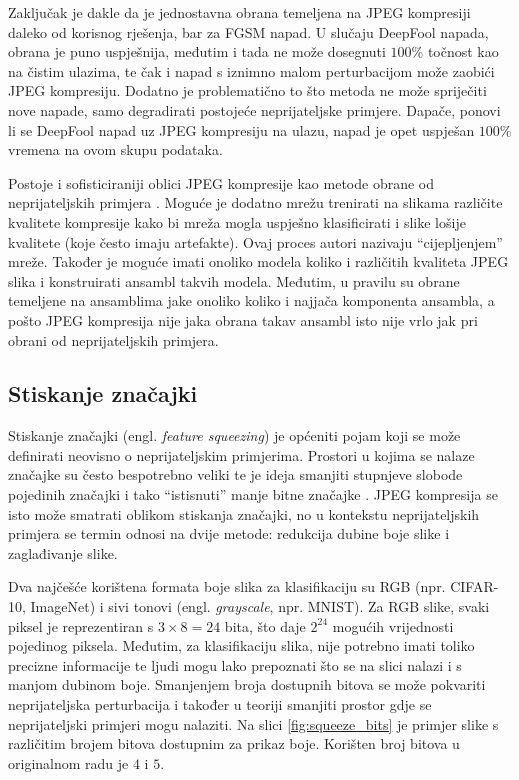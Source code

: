 \documentclass[utf8, diplomski]{fer}
\begin{document}
Zaključak je dakle da je jednostavna obrana temeljena na JPEG kompresiji daleko od korisnog rješenja, bar za FGSM napad. U slučaju DeepFool napada, obrana je puno uspješnija, međutim i tada ne može dosegnuti $100\%$ točnost kao na čistim ulazima, te čak i napad s iznimno malom perturbacijom može zaobići JPEG kompresiju. Dodatno je problematično to što metoda ne može spriječiti nove napade, samo degradirati postojeće neprijateljske primjere. Dapače, ponovi li se DeepFool napad uz JPEG kompresiju na ulazu, napad je opet uspješan $100\%$ vremena na ovom skupu podataka.
\par
Postoje i sofisticiraniji oblici JPEG kompresije kao metode obrane od neprijateljskih primjera \citep{jpeg2}. Moguće je dodatno mrežu trenirati na slikama različite kvalitete kompresije kako bi mreža mogla uspješno klasificirati i slike lošije kvalitete (koje često imaju artefakte). Ovaj proces autori nazivaju ``cijepljenjem'' mreže. Također je moguće imati onoliko modela koliko i različitih kvaliteta JPEG slika i konstruirati ansambl takvih modela. Međutim, u pravilu su obrane temeljene na ansamblima jake onoliko koliko i najjača komponenta ansambla, a pošto JPEG kompresija nije jaka obrana takav ansambl isto nije vrlo jak pri obrani od neprijateljskih primjera.

\subsection{Stiskanje značajki}
Stiskanje značajki (engl. \textit{feature squeezing}) je općeniti pojam koji se može definirati neovisno o neprijateljskim primjerima. Prostori u kojima se nalaze značajke su često bespotrebno veliki te je ideja smanjiti stupnjeve slobode pojedinih značajki i tako ``istisnuti'' manje bitne značajke \citep{squeezing}. JPEG kompresija se isto može smatrati oblikom stiskanja značajki, no u kontekstu neprijateljskih primjera se termin odnosi na dvije metode: redukcija dubine boje slike i zaglađivanje slike. \par
Dva najčešće korištena formata boje slika za klasifikaciju su RGB (npr. CIFAR-10, ImageNet) i sivi tonovi (engl. \textit{grayscale}, npr. MNIST). Za RGB slike, svaki piksel je reprezentiran s $3 \times 8 = 24$ bita, što daje $2^{24}$ mogućih vrijednosti pojedinog piksela. Međutim, za klasifikaciju slika, nije potrebno imati toliko precizne informacije te ljudi mogu lako prepoznati što se na slici nalazi i s manjom dubinom boje. Smanjenjem broja dostupnih bitova se može pokvariti neprijateljska perturbacija i također u teoriji smanjiti prostor gdje se neprijateljski primjeri mogu nalaziti. Na slici \ref{fig:squeeze_bits} je primjer slike s različitim brojem bitova dostupnim za prikaz boje. Korišten broj bitova u originalnom radu je $4$ i $5$.
\end{document}
